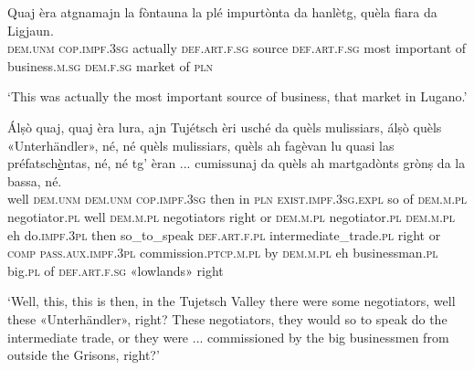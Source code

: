 \begin{linenumbers}
\gll Quaj èra atgnamajn la fòntauna la plé impurtònta da hanlètg, quèla fiara\footnotemark{} da Ligjaun.\\
\textsc{dem.unm} \textsc{cop.impf.3sg} actually  \textsc{def.art.f.sg} source \textsc{def.art.f.sg} most important of business.\textsc{m.sg} \textsc{dem.f.sg} market of \textsc{pln}\\
\end{linenumbers}
\medskip
\glt `This was actually the most important source of  business, that market in Lugano.'
\medskip
 
\begin{linenumbers}
\gll Álṣò quaj, quaj èra lura, ajn Tujétsch èri usché da quèls mulissiars, álṣò quèls «Unterhändler»\footnotemark, né, né quèls mulissiars, quèls ah fagèvan lu quasi las préfatsch\underline{è}ntas, né, né tg’ èran ... cumissunaj da quèls ah martgadònts grònṣ da la bassa, né.\\
well \textsc{dem.unm} \textsc{dem.unm} \textsc{cop.impf.3sg} then in \textsc{pln} \textsc{exist.impf.3sg.expl} so of \textsc{dem.m.pl} negotiator.\textsc{pl} well \textsc{dem.m.pl} negotiators right or \textsc{dem.m.pl} negotiator.\textsc{pl} \textsc{dem.m.pl} eh do.\textsc{impf.3pl} then so\_to\_speak \textsc{def.art.f.pl}  intermediate\_trade.\textsc{pl} right or \textsc{comp} \textsc{pass.aux.impf.3pl} {} commission.\textsc{ptcp.m.pl} by \textsc{dem.m.pl} eh businessman.\textsc{pl} big.\textsc{pl} of \textsc{def.art.f.sg} «lowlands» right \\
\end{linenumbers}
\medskip
 \glt `Well, this, this is then, in the Tujetsch Valley there were some negotiators, well these «Unterhändler», right? These negotiators, they would so to speak do the intermediate trade, or they were ... commissioned by the big businessmen from outside the Grisons, right?'
\medskip

